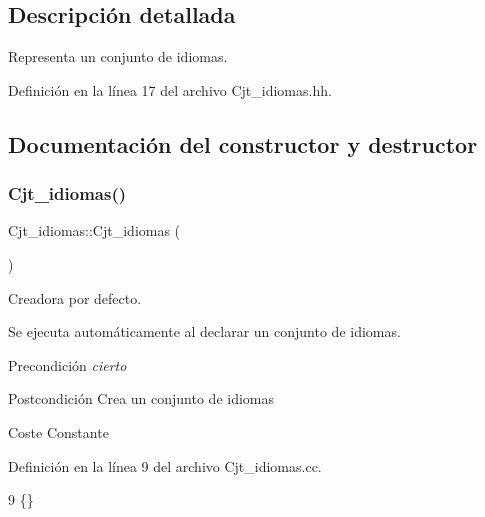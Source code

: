 \subsection{Descripción detallada}
Representa un conjunto de idiomas. 

Definición en la línea 17 del archivo Cjt\+\_\+idiomas.\+hh.



\subsection{Documentación del constructor y destructor}
\mbox{\label{class_cjt__idiomas_acf95ab4c8f5fc442e3724a804658dd38}} 
\subsubsection{\texorpdfstring{Cjt\+\_\+idiomas()}{Cjt\_idiomas()}}
{\footnotesize\ttfamily Cjt\+\_\+idiomas\+::\+Cjt\+\_\+idiomas (\begin{DoxyParamCaption}{ }\end{DoxyParamCaption})}



Creadora por defecto. 

Se ejecuta automáticamente al declarar un conjunto de idiomas. \begin{DoxyPrecond}{Precondición}
{\itshape cierto} 
\end{DoxyPrecond}
\begin{DoxyPostcond}{Postcondición}
Crea un conjunto de idiomas 
\end{DoxyPostcond}
\begin{DoxyParagraph}{Coste}
Constante 
\end{DoxyParagraph}


Definición en la línea 9 del archivo Cjt\+\_\+idiomas.\+cc.


\begin{DoxyCode}
9 \{\}
\end{DoxyCode}
\mbox{\label{class_cjt__idiomas_acd4deb8546959ab728ce5c4bc717e800}} 
